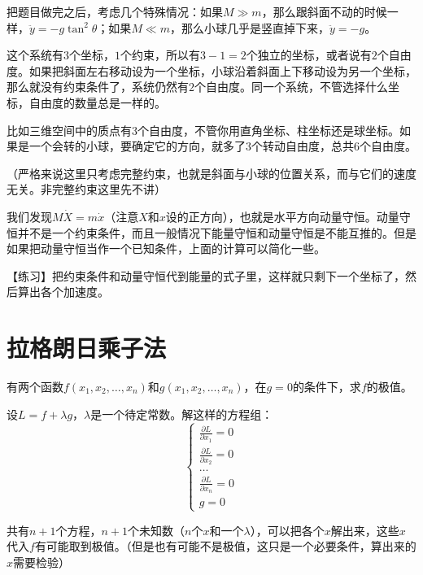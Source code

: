 把题目做完之后，考虑几个特殊情况：如果$M \gg m$，那么跟斜面不动的时候一样，$\ddot y=-g \tan^2 \theta$；如果$M \ll m$，那么小球几乎是竖直掉下来，$\ddot y=-g$。

这个系统有$3$个坐标，$1$个约束，所以有$3-1=2$个独立的坐标，或者说有$2$个自由度。如果把斜面左右移动设为一个坐标，小球沿着斜面上下移动设为另一个坐标，那么就没有约束条件了，系统仍然有$2$个自由度。同一个系统，不管选择什么坐标，自由度的数量总是一样的。

比如三维空间中的质点有$3$个自由度，不管你用直角坐标、柱坐标还是球坐标。如果是一个会转的小球，要确定它的方向，就多了$3$个转动自由度，总共$6$个自由度。

（严格来说这里只考虑完整约束，也就是斜面与小球的位置关系，而与它们的速度无关。非完整约束这里先不讲）

我们发现$M \dot X=m \dot x$（注意$X$和$x$设的正方向），也就是水平方向动量守恒。动量守恒并不是一个约束条件，而且一般情况下能量守恒和动量守恒是不能互推的。但是如果把动量守恒当作一个已知条件，上面的计算可以简化一些。

【练习】把约束条件和动量守恒代到能量的式子里，这样就只剩下一个坐标了，然后算出各个加速度。
\section{拉格朗日乘子法}
有两个函数$f(x_1,x_2,\dots,x_n)$和$g(x_1,x_2,\dots,x_n)$，在$g=0$的条件下，求$f$的极值。

设$L=f+\lambda g$，$\lambda$是一个待定常数。解这样的方程组：
\begin{equation*}
\begin{cases}
\frac{\partial L}{\partial x_1}=0 \\
\frac{\partial L}{\partial x_2}=0 \\
\dots \\
\frac{\partial L}{\partial x_n}=0 \\
g=0
\end{cases}
\end{equation*}

共有$n+1$个方程，$n+1$个未知数（$n$个$x$和一个$\lambda$），可以把各个$x$解出来，这些$x$代入$f$有可能取到极值。（但是也有可能不是极值，这只是一个必要条件，算出来的$x$需要检验）

